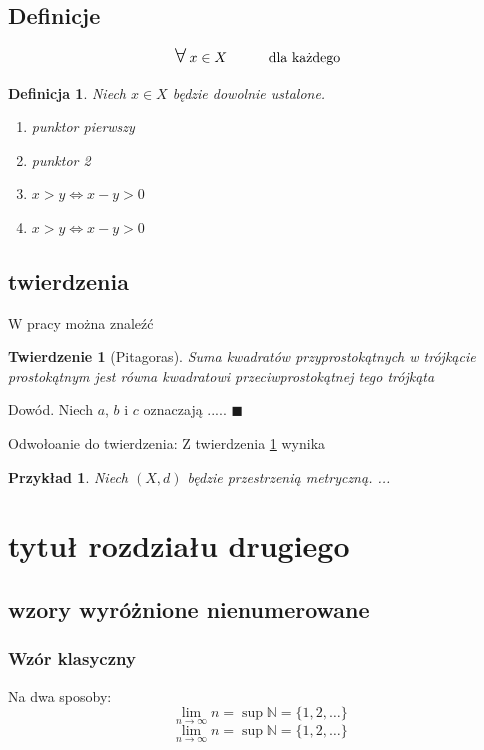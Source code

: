 \documentclass[12pt,oneside,a4paper]{book} %
\newcommand{\N}{\mathbb{N}}
\newcommand{\fal}{\mbox{{\Large $\forall\,$}}}
\theoremstyle{break}
\newtheorem{twr}{Twierdzenie}[chapter]
\newtheorem{defi}{Definicja}[chapter]
\newtheorem{prz}{Przykład}[chapter]
\newenvironment{dowod}{\par\vspace{0.1cm}\par{ \sc Dowód.}}{\hfill $\blacksquare$\par\vspace{0.4cm}\par}
\begin{document}
\pagestyle{fancy}




\lipsum[1-2]
\section{Definicje}
\[
\fal x\in X \quad \qquad \mbox{dla każdego }
\]
\begin{defi}
Niech $x\in X$ będzie dowolnie ustalone.
\begin{enumerate} %
\item punktor pierwszy
\item punktor 2
\item[{\rm (i)}] $x >y \Leftrightarrow x-y>0$
\item[1$^o$] $x >y \Leftrightarrow x-y>0$
\end{enumerate}
\end{defi}

\section{twierdzenia}
W pracy \cite{poz23} można znaleźć %
\begin{twr}[Pitagoras]
\label{t1}%
Suma kwadratów przyprostokątnych w trójkącie prostokątnym jest równa kwadratowi przeciwprostokątnej tego trójkąta
\end{twr}
\begin{dowod}
Niech $a$, $b$ i $c$ oznaczają .....
\end{dowod}
Odwołoanie do twierdzenia: Z twierdzenia \ref{t1} wynika
\begin{prz}
Niech $(X,d)$ będzie przestrzenią metryczną. ...
\end{prz}


\lipsum
\lipsum


\chapter{tytuł rozdziału drugiego}
\thispagestyle{empty}

\lipsum[1-2]




\section{wzory wyróżnione nienumerowane}
\subsection{Wzór klasyczny}
Na dwa sposoby:
\[
\lim\limits_{n\to \infty}n=\sup \N=\{1,2,\ldots \}
\]
$$\lim\limits_{n\to \infty}n=\sup \N=\{1,2,\ldots \}$$
\end{document}
